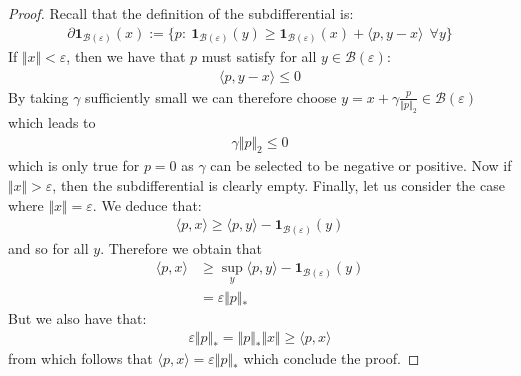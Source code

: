 \begin{proof}
Recall that the definition of the subdifferential is:
\begin{align*}
    \partial\bm{1}_{\mathcal{B}(\varepsilon)}(x):=\{p:~\bm{1}_{\mathcal{B}(\varepsilon)}(y)\geq \bm{1}_{\mathcal{B}(\varepsilon)}(x) + \langle p, y-x\rangle~~\forall y\}
\end{align*}
If $\Vert x\Vert < \varepsilon$, then we have that $p$ must satisfy for all $y\in\mathcal{B}(\varepsilon)$:
\begin{align*}
    \langle p, y-x\rangle\leq 0
\end{align*}
By taking $\gamma$ sufficiently small we can therefore choose $y=x+\gamma \frac{p}{\Vert p \Vert_2}\in\mathcal{B}(\varepsilon)$ which leads to 
\begin{align*}
    \gamma \Vert p\Vert_2\leq 0  
\end{align*}
which is only true for $p=0$ as $\gamma$ can be selected to be negative or positive. Now if $\Vert x\Vert > \varepsilon$, then the subdifferential is clearly empty. Finally, let us consider the case where $\Vert x\Vert = \varepsilon$. We deduce that:
\begin{align*}
    \langle p, x\rangle \geq \langle p, y\rangle -\bm{1}_{\mathcal{B}(\varepsilon)}(y)
\end{align*}
and so for all $y$. Therefore we obtain that
\begin{align*}
    \langle p, x\rangle  &\geq \sup_y \langle p, y\rangle -\bm{1}_{\mathcal{B}(\varepsilon)}(y)\\
    &=\varepsilon\Vert p\Vert_*
\end{align*}
But we also have that:
\begin{align*}
    \varepsilon\Vert p\Vert_*=\Vert p\Vert_* \Vert x\Vert \geq \langle p, x\rangle
\end{align*}
from which follows that $ \langle p, x\rangle=\varepsilon\Vert p\Vert_*$ which conclude the proof.
\end{proof}

